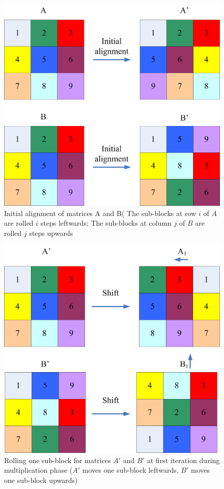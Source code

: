 \documentclass[conference]{IEEEtran}
\begin{document}
\begin{figure}[!h]
    \centering
    \includegraphics[scale=0.4]{Figures/cannon/init_align.png}
    \caption{ Initial alignment of matrices A and B( The sub-blocks at row $i$ of $A$ are rolled $i$ steps leftwards; The sub-blocks at column $j$ of $B$ are rolled $j$ steps upwards}
    \label{mat_init}
\end{figure}
\begin{figure}[!h]
    \centering
    \includegraphics[scale=0.4]{Figures/cannon/rolling.png}
    \caption{ Rolling one sub-block for matrices $A'$ and $B'$ at first iteration during multiplication phase ($A'$ moves one sub-block leftwards, $B'$ moves one sub-block upwards)}
    \label{mat_shift}
\end{figure}
\end{document}
